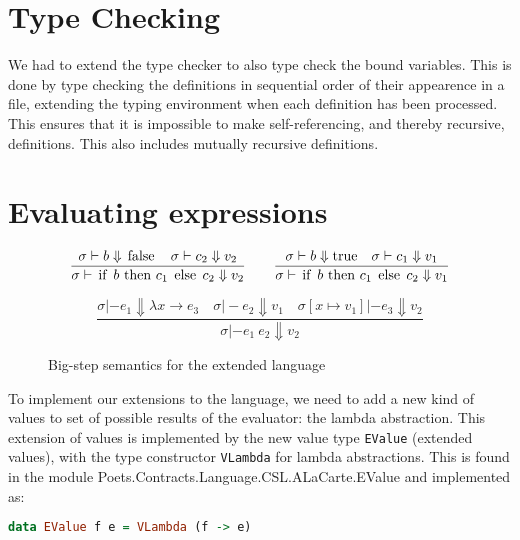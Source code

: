 \documentclass[10pt,a4paper,final,oneside,openany,article]{memoir}
\newcommand{\kw}[1]{\text{\lstinline{#1}}}
\begin{document}

\section{Type Checking}
We had to extend the type checker to also type check the bound
variables. This is done by type checking the definitions in sequential
order of their appearence in a file, extending the typing environment
when each definition has been processed. This ensures that it is
impossible to make self-referencing, and thereby recursive, definitions.
This also includes mutually recursive definitions.

\section{Evaluating expressions}

\begin{figure}
\begin{equation*}
\frac{
  \sigma |- b \Downarrow \kw{false}
  \quad \sigma |- c_2 \Downarrow v_2
}{
  \sigma |- \kw{if} ~b ~\kw{then} ~c_1 ~\kw{else} ~c_2 \Downarrow v_2
}
\quad \quad
\frac{
  \sigma |- b \Downarrow \kw{true}
  \quad \sigma |- c_1 \Downarrow v_1
}{
  \sigma |- \kw{if} ~b ~\kw{then} ~c_1 ~\kw{else} ~c_2 \Downarrow v_1
}\label{eq:eval_condition}
\end{equation*}

\begin{equation*}
\frac{
  \sigma |- e_1 \Downarrow \lambda x \rightarrow e_3
  \quad \sigma |- e_2 \Downarrow v_1
  \quad \sigma[x\mapsto v_1] |- e_3 \Downarrow v_2
}{
  \sigma |- e_1 ~e_2 \Downarrow v_2
}\label{eq:eval_apply}
\end{equation*}

\caption{Big-step semantics for the extended language}
\label{fig:bigstep_semantics}
\end{figure}
To implement our extensions to the language, we need to add a new kind
of values to set of possible results of the evaluator: the lambda
abstraction. This extension of values is implemented by the new value
type \lstinline{EValue} (extended values), with the type constructor
\lstinline{VLambda} for lambda abstractions. This is found in the
module Poets.Contracts.Language.CSL.ALaCarte.EValue and implemented
as:
\begin{lstlisting}[language=Haskell]
data EValue f e = VLambda (f -> e)
\end{lstlisting}
\end{document}

